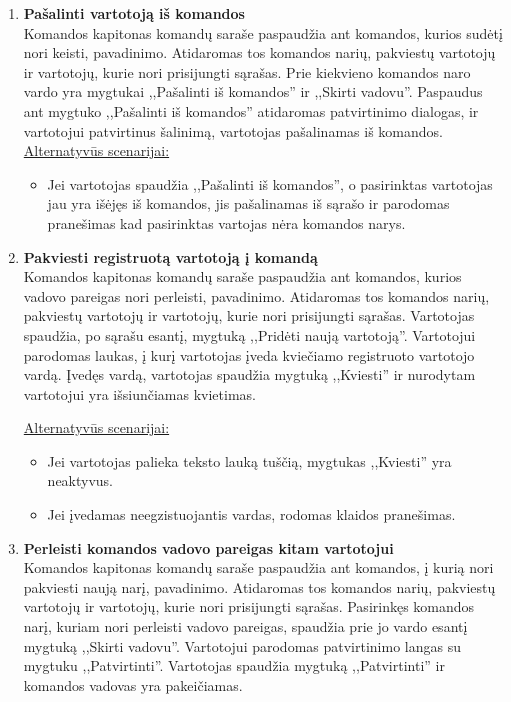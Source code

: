 \documentclass{VUMIFPSkursinis}
\begin{document}
\begin{enumerate} [label = \textbf{U\arabic*.}]
			\item \textbf{Pašalinti vartotoją iš komandos} \\
					Komandos kapitonas komandų saraše paspaudžia ant komandos, kurios sudėtį nori keisti, pavadinimo. Atidaromas tos komandos narių, pakviestų vartotojų ir vartotojų, kurie nori prisijungti sąrašas. Prie kiekvieno komandos naro vardo yra mygtukai ,,Pašalinti iš komandos'' ir ,,Skirti vadovu''. Paspaudus ant mygtuko ,,Pašalinti iš komandos'' atidaromas patvirtinimo dialogas, ir vartotojui patvirtinus šalinimą, vartotojas pašalinamas iš komandos. 
					\underline{Alternatyvūs scenarijai:}
					\begin{itemize}
						\item Jei vartotojas spaudžia ,,Pašalinti iš komandos'', o pasirinktas vartotojas jau yra išėjęs iš komandos, jis pašalinamas iš sąrašo ir parodomas pranešimas kad pasirinktas vartojas nėra komandos narys.
					\end{itemize}
				
			\item \textbf{Pakviesti registruotą vartotoją į komandą}   \\
					Komandos kapitonas komandų saraše paspaudžia ant komandos, kurios vadovo pareigas nori perleisti, pavadinimo. Atidaromas tos komandos narių, pakviestų vartotojų ir vartotojų, kurie nori prisijungti sąrašas.  
					Vartotojas spaudžia, po sąrašu esantį, mygtuką ,,Pridėti naują vartotoją''. Vartotojui parodomas laukas, į kurį vartotojas įveda kviečiamo registruoto vartotojo vardą. Įvedęs vardą, vartotojas spaudžia mygtuką ,,Kviesti'' ir nurodytam vartotojui yra išsiunčiamas kvietimas.
					
					\underline{Alternatyvūs scenarijai:}
					\begin{itemize}
						\item Jei vartotojas palieka teksto lauką tuščią, mygtukas ,,Kviesti'' yra neaktyvus.
						\item Jei įvedamas neegzistuojantis vardas, rodomas klaidos pranešimas.
					\end{itemize}
				
			\item \textbf{Perleisti komandos vadovo pareigas kitam vartotojui}   \\
					Komandos kapitonas komandų saraše paspaudžia ant komandos, į kurią nori pakviesti naują narį, pavadinimo. Atidaromas tos komandos narių, pakviestų vartotojų ir vartotojų, kurie nori prisijungti sąrašas. Pasirinkęs komandos narį, kuriam nori perleisti vadovo pareigas, spaudžia prie jo vardo esantį mygtuką ,,Skirti vadovu''. Vartotojui parodomas patvirtinimo langas su mygtuku ,,Patvirtinti''. Vartotojas spaudžia mygtuką ,,Patvirtinti'' ir komandos vadovas yra pakeičiamas.
					

\end{enumerate}
\end{document}

